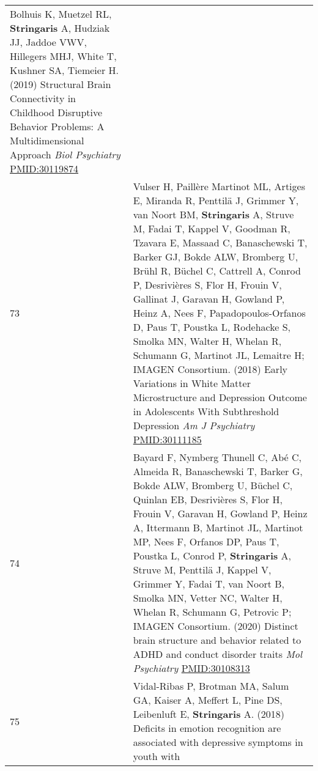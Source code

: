 \documentclass[
]{article}
\begin{document}
\begin{longtable}[]{@{}ll@{}}
\begin{minipage}[t]{0.94\columnwidth}
Bolhuis K, Muetzel RL, \textbf{Stringaris} A, Hudziak JJ, Jaddoe VWV,
Hillegers MHJ, White T, Kushner SA, Tiemeier H. (2019) Structural Brain
Connectivity in Childhood Disruptive Behavior Problems: A
Multidimensional Approach \emph{Biol Psychiatry}
\url{PMID:30119874}\strut
\end{minipage}\tabularnewline
\begin{minipage}[t]{0.01\columnwidth}\raggedright
73\strut
\end{minipage} & \begin{minipage}[t]{0.94\columnwidth}\raggedright
Vulser H, Paillère Martinot ML, Artiges E, Miranda R, Penttilä J,
Grimmer Y, van Noort BM, \textbf{Stringaris} A, Struve M, Fadai T,
Kappel V, Goodman R, Tzavara E, Massaad C, Banaschewski T, Barker GJ,
Bokde ALW, Bromberg U, Brühl R, Büchel C, Cattrell A, Conrod P,
Desrivières S, Flor H, Frouin V, Gallinat J, Garavan H, Gowland P, Heinz
A, Nees F, Papadopoulos-Orfanos D, Paus T, Poustka L, Rodehacke S,
Smolka MN, Walter H, Whelan R, Schumann G, Martinot JL, Lemaitre H;
IMAGEN Consortium. (2018) Early Variations in White Matter
Microstructure and Depression Outcome in Adolescents With Subthreshold
Depression \emph{Am J Psychiatry} \url{PMID:30111185}\strut
\end{minipage}\tabularnewline
\begin{minipage}[t]{0.01\columnwidth}\raggedright
74\strut
\end{minipage} & \begin{minipage}[t]{0.94\columnwidth}\raggedright
Bayard F, Nymberg Thunell C, Abé C, Almeida R, Banaschewski T, Barker G,
Bokde ALW, Bromberg U, Büchel C, Quinlan EB, Desrivières S, Flor H,
Frouin V, Garavan H, Gowland P, Heinz A, Ittermann B, Martinot JL,
Martinot MP, Nees F, Orfanos DP, Paus T, Poustka L, Conrod P,
\textbf{Stringaris} A, Struve M, Penttilä J, Kappel V, Grimmer Y, Fadai
T, van Noort B, Smolka MN, Vetter NC, Walter H, Whelan R, Schumann G,
Petrovic P; IMAGEN Consortium. (2020) Distinct brain structure and
behavior related to ADHD and conduct disorder traits \emph{Mol
Psychiatry} \url{PMID:30108313}\strut
\end{minipage}\tabularnewline
\begin{minipage}[t]{0.01\columnwidth}\raggedright
75\strut
\end{minipage} & \begin{minipage}[t]{0.94\columnwidth}\raggedright
Vidal-Ribas P, Brotman MA, Salum GA, Kaiser A, Meffert L, Pine DS,
Leibenluft E, \textbf{Stringaris} A. (2018) Deficits in emotion
recognition are associated with depressive symptoms in youth with

\end{minipage}
\end{longtable}
\end{document}
